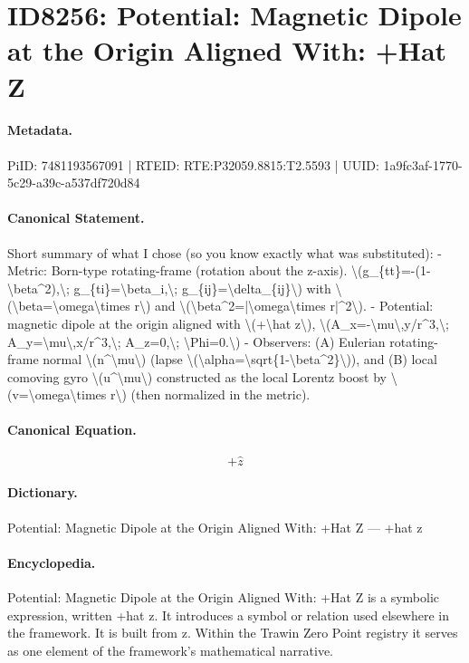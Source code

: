 \section*{ID8256: Potential: Magnetic Dipole at the Origin Aligned With: +Hat Z}
\paragraph{Metadata.}
PiID: 7481193567091 | RTEID: RTE:P32059.8815:T2.5593 | UUID: 1a9fc3af-1770-5c29-a39c-a537df720d84

\paragraph{Canonical Statement.}
Short summary of what I chose (so you know exactly what was substituted): - Metric: Born-type rotating-frame (rotation about the z-axis). \textbackslash{}(g\_\{tt\}=-(1-\textbackslash{}beta\textasciicircum{}2),\textbackslash{}; g\_\{ti\}=\textbackslash{}beta\_i,\textbackslash{}; g\_\{ij\}=\textbackslash{}delta\_\{ij\}\textbackslash{}) with \textbackslash{}(\textbackslash{}beta=\textbackslash{}omega\textbackslash{}times r\textbackslash{}) and \textbackslash{}(\textbackslash{}beta\textasciicircum{}2=|\textbackslash{}omega\textbackslash{}times r|\textasciicircum{}2\textbackslash{}). - Potential: magnetic dipole at the origin aligned with \textbackslash{}(+\textbackslash{}hat z\textbackslash{}), \textbackslash{}(A\_x=-\textbackslash{}mu\textbackslash{},y/r\textasciicircum{}3,\textbackslash{}; A\_y=\textbackslash{}mu\textbackslash{},x/r\textasciicircum{}3,\textbackslash{}; A\_z=0,\textbackslash{}; \textbackslash{}Phi=0.\textbackslash{}) - Observers: (A) Eulerian rotating-frame normal \textbackslash{}(n\textasciicircum{}\textbackslash{}mu\textbackslash{}) (lapse \textbackslash{}(\textbackslash{}alpha=\textbackslash{}sqrt\{1-\textbackslash{}beta\textasciicircum{}2\}\textbackslash{})), and (B) local comoving gyro \textbackslash{}(u\textasciicircum{}\textbackslash{}mu\textbackslash{}) constructed as the local Lorentz boost by \textbackslash{}(v=\textbackslash{}omega\textbackslash{}times r\textbackslash{}) (then normalized in the metric).

\paragraph{Canonical Equation.}
\[
+\hat z
\]

\paragraph{Dictionary.}
Potential: Magnetic Dipole at the Origin Aligned With: +Hat Z — +hat z

\paragraph{Encyclopedia.}
Potential: Magnetic Dipole at the Origin Aligned With: +Hat Z is a symbolic expression, written +hat z. It introduces a symbol or relation used elsewhere in the framework. It is built from z. Within the Trawin Zero Point registry it serves as one element of the framework's mathematical narrative.
